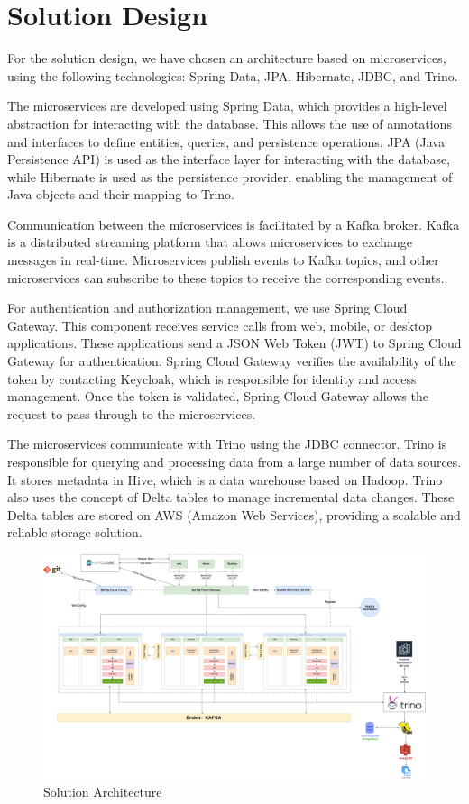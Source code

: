 \section{Solution Design}

For the solution design, we have chosen an architecture based on microservices, using the following technologies: Spring Data, JPA, Hibernate, JDBC, and Trino.

The microservices are developed using Spring Data, which provides a high-level abstraction for interacting with the database. This allows the use of annotations and interfaces to define entities, queries, and persistence operations. JPA (Java Persistence API) is used as the interface layer for interacting with the database, while Hibernate is used as the persistence provider, enabling the management of Java objects and their mapping to Trino.

Communication between the microservices is facilitated by a Kafka broker. Kafka is a distributed streaming platform that allows microservices to exchange messages in real-time. Microservices publish events to Kafka topics, and other microservices can subscribe to these topics to receive the corresponding events.

For authentication and authorization management, we use Spring Cloud Gateway. This component receives service calls from web, mobile, or desktop applications. These applications send a JSON Web Token (JWT) to Spring Cloud Gateway for authentication. Spring Cloud Gateway verifies the availability of the token by contacting Keycloak, which is responsible for identity and access management. Once the token is validated, Spring Cloud Gateway allows the request to pass through to the microservices.

The microservices communicate with Trino using the JDBC connector. Trino is responsible for querying and processing data from a large number of data sources. It stores metadata in Hive, which is a data warehouse based on Hadoop. Trino also uses the concept of Delta tables to manage incremental data changes. These Delta tables are stored on AWS (Amazon Web Services), providing a scalable and reliable storage solution.

\begin{figure}[H]
\centering
\includegraphics[width=\linewidth]{images/architecture-solution.png}
\caption{Solution Architecture}\label{fig:solution}
\end{figure}

